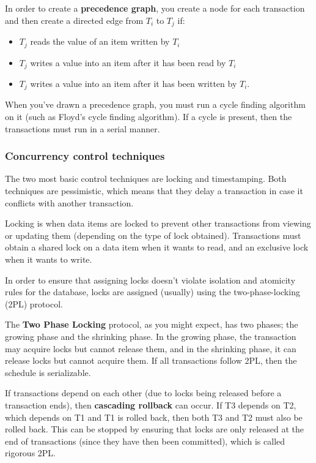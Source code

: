 In order to create a \textbf{precedence graph}, you create a node for each
transaction and then create a directed edge from $T_i$ to $T_j$ if:

\begin{itemize}
  \item $T_j$ reads the value of an item written by $T_i$
  \item $T_j$ writes a value into an item after it has been read by $T_i$
  \item $T_j$ writes a value into an item after it has been written by $T_i$.
\end{itemize}

When you've drawn a precedence graph, you must run a cycle finding algorithm on
it (such as Floyd's cycle finding algorithm). If a cycle is present, then the
transactions must run in a serial manner.

\subsubsection{Concurrency control techniques}

The two most basic control techniques are locking and timestamping. Both
techniques are pessimistic, which means that they delay a transaction in case it
conflicts with another transaction.

Locking is when data items are locked to prevent other transactions from viewing
or updating them (depending on the type of lock obtained). Transactions must
obtain a shared lock on a data item when it wants to read, and an exclusive lock
when it wants to write.

In order to ensure that assigning locks doesn't violate isolation and atomicity
rules for the database, locks are assigned (usually) using the two-phase-locking
(2PL) protocol.

The \textbf{Two Phase Locking} protocol, as you might expect, has two phases;
the growing phase and the shrinking phase. In the growing phase, the transaction
may acquire locks but cannot release them, and in the shrinking phase, it can
release locks but cannot acquire them. If all transactions follow 2PL, then the
schedule is serializable.

If transactions depend on each other (due to locks being released before a
transaction ends), then \textbf{cascading rollback} can occur. If T3 depends on
T2, which depends on T1 and T1 is rolled back, then both T3 and T2 must also be
rolled back. This can be stopped by ensuring that locks are only released at
the end of transactions (since they have then been committed), which is called
rigorous 2PL.

